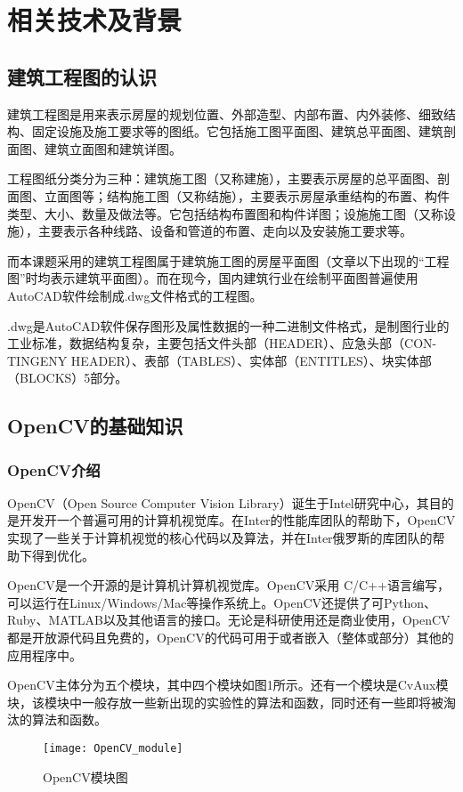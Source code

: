 \section{相关技术及背景}

\subsection{建筑工程图的认识}
建筑工程图是用来表示房屋的规划位置、外部造型、内部布置、内外装修、细致结构、固定设施及施工要求等的图纸。它包括施工图平面图、建筑总平面图、建筑剖面图、建筑立面图和建筑详图。

工程图纸分类分为三种：建筑施工图（又称建施），主要表示房屋的总平面图、剖面图、立面图等；结构施工图（又称结施），主要表示房屋承重结构的布置、构件类型、大小、数量及做法等。它包括结构布置图和构件详图；设施施工图（又称设施），主要表示各种线路、设备和管道的布置、走向以及安装施工要求等。

而本课题采用的建筑工程图属于建筑施工图的房屋平面图（文章以下出现的“工程图”时均表示建筑平面图）。而在现今，国内建筑行业在绘制平面图普遍使用AutoCAD软件绘制成.dwg文件格式的工程图。

.dwg是AutoCAD软件保存图形及属性数据的一种二进制文件格式，是制图行业的工业标准，数据结构复杂，主要包括文件头部（HEADER）、应急头部（CON-TINGENY HEADER）、表部（TABLES）、实体部（ENTITLES）、块实体部（BLOCKS）5部分。


\subsection{OpenCV的基础知识}
\subsubsection{OpenCV介绍}
OpenCV（Open Source Computer Vision Library）诞生于Intel研究中心，其目的是开发开一个普遍可用的计算机视觉库。在Inter的性能库团队的帮助下，OpenCV实现了一些关于计算机视觉的核心代码以及算法，并在Inter俄罗斯的库团队的帮助下得到优化。

OpenCV是一个开源的是计算机计算机视觉库。OpenCV采用 C/C++语言编写，可以运行在Linux/Windows/Mac等操作系统上。OpenCV还提供了可Python、Ruby、MATLAB以及其他语言的接口。无论是科研使用还是商业使用，OpenCV都是开放源代码且免费的，OpenCV的代码可用于或者嵌入（整体或部分）其他的应用程序中。

OpenCV主体分为五个模块，其中四个模块如图1所示。还有一个模块是CvAux模块，该模块中一般存放一些新出现的实验性的算法和函数，同时还有一些即将被淘汰的算法和函数。
\begin{figure}[htbp]
    \label{gra1}
    \begin{center}
        \texttt{[image: OpenCV\_module]}
        \caption{OpenCV模块图}
    \end{center}
\end{figure}

